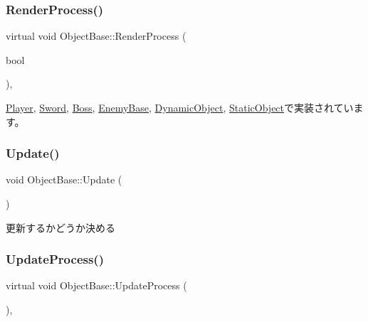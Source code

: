 \subsubsection{\texorpdfstring{Render\+Process()}{RenderProcess()}}
{\footnotesize\ttfamily virtual void Object\+Base\+::\+Render\+Process (\begin{DoxyParamCaption}\item[{bool}]{ }\end{DoxyParamCaption})\hspace{0.3cm}{\ttfamily [protected]}, {}}



\mbox{\hyperlink{class_player_a8ac2e54fe5672d32186456b9735c02c3}{Player}}, \mbox{\hyperlink{class_sword_a7f5d2c6e6e0104e9a85f600eec14ef6d}{Sword}}, \mbox{\hyperlink{class_boss_a6681bd6fc6dc35e200f9e63f196301af}{Boss}}, \mbox{\hyperlink{class_enemy_base_af874ce6fc410fddc7d55ffd7c7bedac8}{Enemy\+Base}}, \mbox{\hyperlink{class_dynamic_object_aa7488e1b4dfd7049447535d93d9d6783}{Dynamic\+Object}}, \mbox{\hyperlink{class_static_object_afec57009537695c4715386120a619942}{Static\+Object}}で実装されています。

\mbox{\label{class_object_base_a5b5672034139b22235ada326eb16dd3e}} 
\subsubsection{\texorpdfstring{Update()}{Update()}}
{\footnotesize\ttfamily void Object\+Base\+::\+Update (\begin{DoxyParamCaption}{ }\end{DoxyParamCaption})}



更新するかどうか決める 

\mbox{\label{class_object_base_a8b5b72b363a419767efde0b0e692ea95}} 
\subsubsection{\texorpdfstring{Update\+Process()}{UpdateProcess()}}
{\footnotesize\ttfamily virtual void Object\+Base\+::\+Update\+Process (\begin{DoxyParamCaption}{ }\end{DoxyParamCaption})\hspace{0.3cm}{\ttfamily [protected]}, {}}



